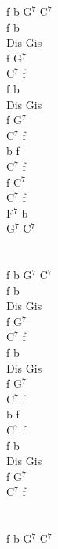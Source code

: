 \documentclass[a5paper, 10pt]{book}
\begin{document}
\begin{minipage}[t]{0.2\textwidth}
 f b G$^7$ C$^7$\\
 
 f b\\
 Dis Gis\\
 f G$^7$\\
 C$^7$ f\\

 f b\\
 Dis Gis\\
 f G$^7$\\
 C$^7$ f\\
 
 b f\\
 C$^7$ f\\
 
 f C$^7$\\
 C$^7$ f\\
 F$^7$ b\\
 G$^7$ C$^7$\\
 \\
 \\
  f b G$^7$ C$^7$\\

   f b\\
 Dis Gis\\
 f G$^7$\\
 C$^7$ f\\

 f b\\
 Dis Gis\\
 f G$^7$\\
 C$^7$ f\\

 b f\\
 C$^7$ f\\
 
 f b\\
 Dis Gis\\
 f G$^7$\\
 C$^7$ f\\
 \\
 \\
  f b G$^7$ C$^7$\\
\end{minipage}

\newpage
\end{document}
